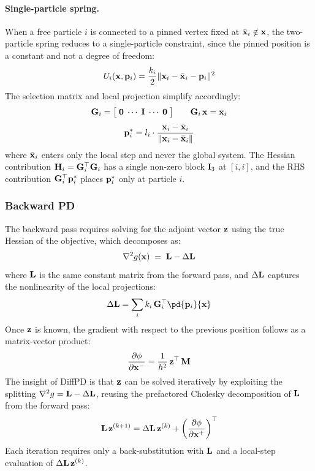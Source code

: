 \paragraph{Single-particle spring.}
When a free particle $i$ is connected to a pinned vertex fixed at $\bar{\mathbf{x}}_{i} \notin \mathbf{x}$, the two-particle spring reduces to a single-particle constraint, since the pinned position is a constant and not a degree of freedom:
\begin{equation}
    U_i(\mathbf{x}, \mathbf{p}_i) = \frac{k_i}{2} \| \mathbf{x}_{i} - \bar{\mathbf{x}}_{i} - \mathbf{p}_i \|^2
\end{equation}
The selection matrix and local projection simplify accordingly:
\begin{equation*}
    \mathbf{G}_i = \big[\;\mathbf{0} \;\cdots\; \mathbf{I} \;\cdots\; \mathbf{0}\;\big]
    \qquad
    \mathbf{G}_i\,\mathbf{x} = \mathbf{x}_{i}
\end{equation*}
\begin{equation}
    \mathbf{p}_i^{*} = l_{i} \cdot \frac{\mathbf{x}_{i} - \bar{\mathbf{x}}_{i}}{\| \mathbf{x}_{i} - \bar{\mathbf{x}}_{i}\|}
\end{equation}
where $\bar{\mathbf{x}}_i$ enters only the local step and never the global system. The Hessian contribution $\mathbf{H}_i = \mathbf{G}_i^\top\mathbf{G}_i$ has a single non-zero block $\mathbf{I}_3$ at $[i, i]$, and the RHS contribution $\mathbf{G}_i^\top\mathbf{p}_i^*$ places $\mathbf{p}_i^*$ only at particle $i$.

\subsubsection{Backward PD}
The backward pass requires solving for the adjoint vector $\mathbf{z}$ using the true Hessian of the objective, which decomposes as:
\begin{equation*}
    \nabla^2 g(\mathbf{x}) \;=\; \mathbf{L} - \Delta \mathbf{L}
\end{equation*}
where $\mathbf{L}$ is the same constant matrix from the forward pass, and $\Delta\mathbf{L}$ captures the nonlinearity of the local projections:
\begin{equation*}
    \Delta \LL = \sum_i k_i\, \G_i^\top\pd{\p_i}{\x}
\end{equation*}
Once $\mathbf{z}$ is known, the gradient with respect to the previous position follows as a matrix-vector product:
\begin{equation*}
    \frac{\partial \phi}{\partial \mathbf{x}^-} = \frac{1}{h^2}\,\mathbf{z}^\top\,\mathbf{M}
\end{equation*}
The insight of DiffPD \cite{du2021diffpd} is that $\mathbf{z}$ can be solved iteratively by exploiting the splitting $\nabla^2 g = \mathbf{L} - \Delta\mathbf{L}$, reusing the prefactored Cholesky decomposition of $\mathbf{L}$ from the forward pass:
\begin{equation*}
    \mathbf{L}\,\mathbf{z}^{(k+1)} = \Delta\mathbf{L}\,\mathbf{z}^{(k)} + \left(\frac{\partial \phi}{\partial \mathbf{x}^+}\right)^\top
\end{equation*}
Each iteration requires only a back-substitution with $\mathbf{L}$ and a local-step evaluation of $\Delta\mathbf{L}\,\mathbf{z}^{(k)}$.

